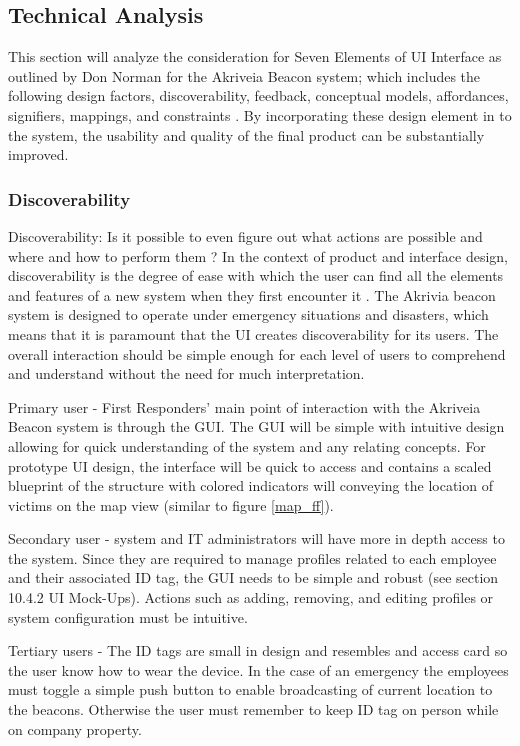 

\subsection{Technical Analysis}
\bigskip
This section will analyze the consideration for Seven Elements of UI Interface as outlined by Don Norman for the Akriveia Beacon system; which includes the following design factors, discoverability, feedback, conceptual models, affordances, signifiers, mappings, and constraints \cite{R10-3-1}. By incorporating these design element in to the system, the usability and quality of the final product can be substantially improved. 
\medskip

\subsubsection{Discoverability}
\medskip
Discoverability: Is it possible to even figure out what actions are possible and where and how to perform them \cite{R10-3-1}?  In the context of product and interface design, discoverability is the degree of ease with which the user can find all the elements and features of a new system when they first encounter it \cite{R10-3-2}. The Akrivia beacon system is designed to operate under emergency situations and disasters, which means that it is paramount that the UI creates discoverability for its users. The overall interaction should be simple enough for each level of users to comprehend and understand without the need for much interpretation. 

\bigskip
Primary user - First Responders’ main point of interaction with the Akriveia Beacon system is through the GUI. The GUI will be simple with intuitive design allowing for quick understanding of the system and any relating concepts. For prototype UI design, the interface will be quick to access  and contains a scaled blueprint of the structure with colored indicators will conveying the location of victims on the map view (similar to figure \ref{map_ff}). 

\bigskip
Secondary user - system and IT administrators will have more in depth access to the system. Since they are required to manage profiles related to each employee and their associated ID tag, the GUI needs to be simple and robust (see section 10.4.2 UI Mock-Ups). Actions such as adding, removing, and editing profiles or system configuration must be intuitive. 

\bigskip
Tertiary users - The ID tags are small in design and resembles and access card so the user know how to wear the device. In the case of an emergency the employees must toggle a simple push button to enable broadcasting of current location to the beacons. Otherwise the user must remember to keep ID tag on person while on company property.
\medskip


